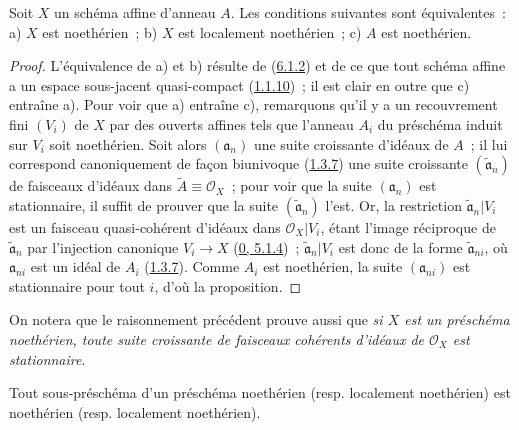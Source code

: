 \begin{proposition}[6.1.3]
\label{I.6.1.3-fr}
Soit $X$ un schéma affine d'anneau $A$. Les conditions suivantes sont
équivalentes~: a) $X$ est noethérien~; b) $X$ est localement noethérien~;
c) $A$ est noethérien.
\end{proposition}

\begin{proof}
L'équivalence de a) et b) résulte de (\hyperref[I.6.1.2-fr]{6.1.2}) et de ce
que tout schéma affine a un espace sous-jacent quasi-compact
(\hyperref[I.1.1.10-fr]{1.1.10})~; il est clair en outre que c) entraîne a).
Pour voir que a) entraîne c), remarquons qu'il y a un recouvrement fini
$(V_i)$ de $X$ par des ouverts affines tels que l'anneau $A_i$ du préschéma
induit sur $V_i$ soit noethérien. Soit alors $(\mathfrak{a}_n)$ une suite
croissante d'idéaux de $A$~; il lui correspond canoniquement de façon
biunivoque (\hyperref[I.1.3.7-fr]{1.3.7}) une suite croissante
$(\widetilde{\mathfrak{a}}_n)$ de faisceaux d'idéaux dans
$\widetilde{A}\equiv\mathscr{O}_X$~; pour voir que la suite
$(\mathfrak{a}_n)$ est stationnaire, il suffit de prouver que la suite
$(\widetilde{\mathfrak{a}}_n)$ l'est. Or, la restriction
$\widetilde{\mathfrak{a}}_n|V_i$ est un faisceau quasi-cohérent d'idéaux dans
$\mathscr{O}_X|V_i$, étant l'image réciproque de
$\widetilde{\mathfrak{a}}_n$ par l'injection canonique $V_i\to X$
(\hyperref[0.5.1.4-fr]{0, 5.1.4})~; $\widetilde{\mathfrak{a}}_n|V_i$ est
donc de la forme $\widetilde{\mathfrak{a}}_{ni}$, où $\mathfrak{a}_{ni}$ est
un idéal de $A_i$ (\hyperref[I.1.3.7-fr]{1.3.7}). Comme $A_i$ est noethérien,
la suite $(\mathfrak{a}_{ni})$ est stationnaire pour tout $i$, d'où la
proposition.
\end{proof}

On notera que le raisonnement précédent prouve aussi que \emph{si $X$ est un
préschéma noethérien, toute suite croissante de faisceaux cohérents d'idéaux
de $\mathscr{O}_X$ est stationnaire}.

\begin{proposition}[6.1.4]
\label{I.6.1.4-fr}
Tout sous-préschéma d'un préschéma noethérien (resp. localement noethérien)
est noethérien (resp. localement noethérien).
\end{proposition}

